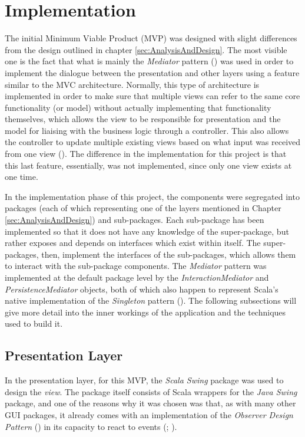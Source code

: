 \section{Implementation} \label{sec:Implementation}

The initial Minimum Viable Product (MVP) was designed with slight differences
from the design outlined in chapter \ref{sec:AnalysisAndDesign}. The most
visible one is the fact that what is mainly the \emph{Mediator} pattern
(\cite[][Ch.~9,~Location~3594]{nikolov2016scala}) was used in order to
implement the dialogue between the presentation and other layers using a
feature similar to the MVC architecture. Normally, this type of architecture is
implemented in order to make sure that multiple views can refer to the same
core functionality (or model) without actually implementing that functionality
themselves, which allows the view to be responsible for presentation and the
model for liaising with the business logic through a controller. This also
allows the controller to update multiple existing views based on what input was
received from one view (\cite[][p.~381]{bennett2010object}). The difference in
the implementation for this project is that this last feature, essentially, was
not implemented, since only one view exists at one time.

In the implementation phase of this project, the components were segregated
into packages (each of which representing one of the layers mentioned in
Chapter \ref{sec:AnalysisAndDesign}) and sub-packages. Each sub-package has
been implemented so that it does not have any knowledge of the super-package,
but rather exposes and depends on interfaces which exist within itself. The
super-packages, then, implement the interfaces of the sub-packages, which
allows them to interact with the sub-package components. The \emph{Mediator}
pattern was implemented at the default package level by the
\emph{InteractionMediator} and \emph{PersistenceMediator} objects, both of
which also happen to represent Scala's native implementation of the
\emph{Singleton} pattern (\cite[][Ch.~6,~Location.~2242]{nikolov2016scala}).
The following subsections will give more detail into the inner workings of the
application and the techniques used to build it.

\subsection{Presentation Layer} \label{sec:Implementation.Presentation}
In the presentation layer, for this MVP, the \emph{Scala Swing} package was
used to design the \emph{view}. The package itself consists of Scala wrappers
for the \emph{Java Swing} package, and one of the reasons why it was chosen was
that, as with many other GUI packages, it already comes with an implementation
of the \emph{Observer Design Pattern} (\cite[][p.~293]{gamma1995design}) in its
capacity to react to events (\cite[][p.~5]{maier2009scala};
\cite[][Ch.~9,~Location~3731]{nikolov2016scala}).

